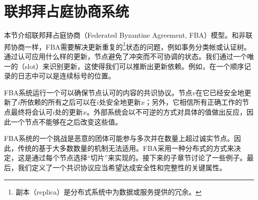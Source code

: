 \section{联邦拜占庭协商系统}\label{sec:fba}

本节介绍联邦拜占庭协商（Federated Byzantine Agreement, FBA）模型。和非联邦协商一样，FBA需要解决更新重复的\footnote{副本（replica）是分布式系统中为数据或服务提供的冗余。}状态的问题，例如事务分类帐或认证树。通过认可应用什么样的更新，节点避免了冲突而不可协调的状态。我们通过一个唯一的{\slot}（slot）来识别更新，这使得我们可以推断出更新依赖。例如，在一个顺序记录的日志中{\slot}可以是连续标号的位置。

FBA系统运行一个可以确保节点认可{\slot}的内容的共识协议。节点$v$在它已经安全地更新了{\slot}$i$所依赖的所有{\slot}之后可以在{\slot}$i$处安全地更新$x$；另外，它相信所有正确工作的节点最终将会认可{\slot}$i$处的更新$x$。外部系统会以不可逆的方式对具体的值做出反应，因此一个节点不能够在之后改变这些值。

FBA系统的一个挑战是恶意的团体可能参与多次并在数量上超过诚实节点。因此，传统的基于大多数数量的{\quorum}机制无法适用。FBA采用一种分布式的方式来决定{\quorum}，这是通过每个节点选择``{\quorum}切片''来实现的。接下来的子章节讨论了一些例子。最后，我们定义了一个共识协议应当希望达成安全性和完整性的关键属性。



